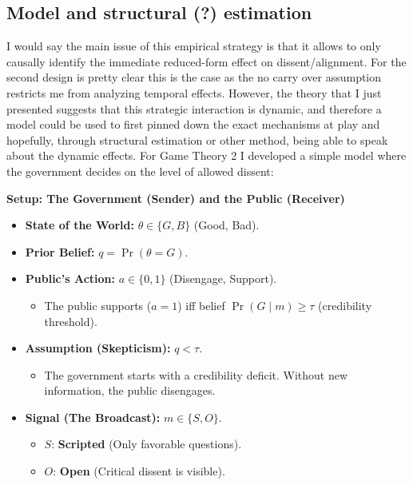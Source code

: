 \documentclass[11pt]{article}
\begin{document}
\subsection{Model and structural (?) estimation}

I would say the main issue of this empirical strategy is that it allows to only causally identify the immediate reduced-form effect on dissent/alignment. For the second design is pretty clear this is the case as the no carry over assumption restricts me from analyzing temporal effects. However, the theory that I just presented suggests that this strategic interaction is dynamic, and therefore a model could be used to first pinned down the exact mechanisms at play and hopefully, through structural estimation or other method, being able to speak about the dynamic effects. For Game Theory 2 I developed a simple model where the government decides on the level of allowed dissent:

\textbf{Setup: The Government (Sender) and the Public (Receiver)}

\begin{itemize}
    \setlength\itemsep{0.8em}
    \item \textbf{State of the World:} $\theta \in \{G, B\}$ (Good, Bad).
    \item \textbf{Prior Belief:} $q = \Pr(\theta = G)$.
    \item \textbf{Public's Action:} $a \in \{0, 1\}$ (Disengage, Support).
    \begin{itemize}
        \item The public supports ($a=1$) iff belief $\Pr(G \mid m) \ge \tau$ (credibility threshold).
    \end{itemize}
    \item \textbf{Assumption (Skepticism):} $q < \tau$. 
    \begin{itemize}
        \item \footnotesize{The government starts with a credibility deficit. Without new information, the public disengages.}
    \end{itemize}
    \item \textbf{Signal (The Broadcast):} $m \in \{S, O\}$.
    \begin{itemize}
        \item $S$: \textbf{Scripted} (Only favorable questions).
        \item $O$: \textbf{Open} (Critical dissent is visible).
    \end{itemize}
\end{itemize}
\end{document}
